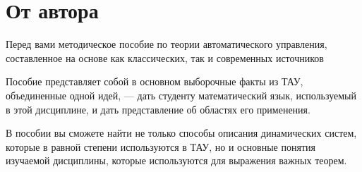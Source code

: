 \documentclass[../../TAU.tex]{subfiles}
\begin{document}
    \chapter*{От автора}

        Перед вами методическое пособие по теории автоматического управления, составленное на основе как классических, так и современных источников

        Пособие представляет собой в основном выборочные факты из ТАУ, объединенные одной идей, — дать студенту математический язык, используемый в этой дисциплине, и дать представление об областях его применения.

        В пособии вы сможете найти не только способы описания динамических систем, которые в равной степени используются в ТАУ, но и основные понятия изучаемой дисциплины, которые используются для выражения важных теорем.
\end{document}
